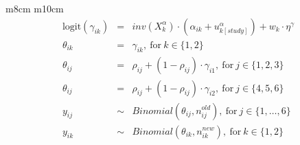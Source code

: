 \documentclass{article}
\begin{document}
\begin{tabular}{ m{8cm} m{10cm}}
\[\begin{array}{rcl}
    \mathrm{logit}(\gamma_{ik}) & = & \mathit{inv}(X_k^{\alpha}) \cdot (\alpha_{ik} + u_{k[study]}^{\alpha}) + w_{k} \cdot \eta^{\gamma}\\    
    \theta_{ik} & = & \gamma_{ik},\ \mathrm{for}\ k \in \{1, 2\} \\
    \theta_{ij} & = & \rho_{ij} + (1-\rho_{ij}) \cdot \gamma_{i1},\ \mathrm{for}\ j \in \{1, 2, 3\} \\
    \theta_{ij} & = & \rho_{ij} + (1-\rho_{ij}) \cdot \gamma_{i2},\ \mathrm{for}\ j \in \{4, 5, 6\} \\
    y_{ij} & \sim & Binomial(\theta_{ij}, n_{ij}^{old}),\ \mathrm{for}\ j \in \{1, \ldots, 6\} \\
    y_{ik} & \sim & Binomial(\theta_{ik}, n_{ik}^{new}),\ \mathrm{for}\ k \in \{1, 2\} \\
  \end{array}
\]

\end{tabular}

\end{document}
